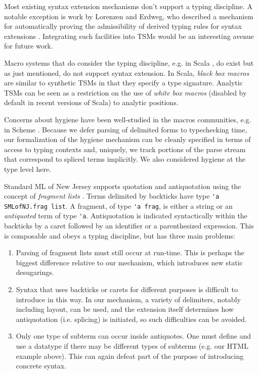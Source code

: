 \documentclass{sig-alternate}[10pt]
\newcommand{\lstinlinew}[1]{\lstinline[style=wyvern]{#1}}
\begin{document}
Most existing syntax extension mechanisms don't support a typing discipline. A notable exception is work by Lorenzen and Erdweg,  who described a mechanism for automatically proving the admissibility of derived typing rules for syntax extensions \cite{conf/icfp/LorenzenE13}. Integrating such facilities into TSMs would be an interesting avenue for future work. %


Macro systems that do consider the typing discipline, e.g. in Scala \cite{ScalaMacros2013}, do exist but as just mentioned, do not support syntax extension. In Scala, \emph{black box macros} are similar to synthetic TSMs in that they specify a type signature. Analytic TSMs can be seen as a restriction on the use of \emph{white box macros} (disabled by default in recent versions of Scala) to analytic positions. 

Concerns about hygiene have been well-studied in the macros communities, e.g. in Scheme \cite{Dybvig:1992:SAS:173617.173620}. Because we defer parsing of delimited forms to typechecking time, our formalization of the hygiene mechanism can be cleanly specified in terms of access to typing contexts and, uniquely, we track portions of the parse stream that correspond to spliced terms implicitly. We also considered hygiene at the type level here.

Standard ML of New Jersey supports quotation and antiquotation using the concept of \emph{fragment lists} \cite{SML/Quote}. Terms delimited by backticks have type \lstinlinew{'a SMLofNJ.frag list}. A fragment, of type \lstinlinew{'a frag}, is either a string or an \emph{antiquoted} term of type \lstinlinew{'a}. Antiquotation is indicated syntactically within the backticks by a caret followed by an identifier or a parenthesized expression. This is composable and obeys a typing discipline, but has three main problems:
\vspace{-5px}\begin{enumerate}[noitemsep]
\item Parsing of fragment lists must still occur at run-time. This is perhaps the biggest difference relative to our mechanism, which introduces new static desugarings. %
\item Syntax that uses backticks or carets for different purposes is difficult to introduce in this way. In our mechanism, a variety of delimiters, notably including layout, can be used, and the extension itself determines how antiquotation (i.e. splicing) is initiated, so such difficulties can be avoided.
\item Only one type of subterm can occur inside antiquotes. One must define and use a datatype if there may be different types of subterms (e.g. our HTML example above). This can again defeat part of the purpose of introducing concrete syntax.
\end{enumerate}
\end{document}

